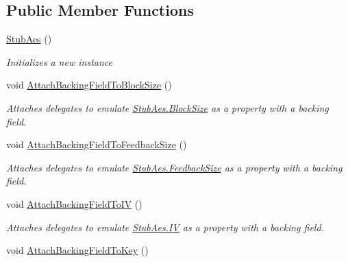 \subsection*{Public Member Functions}
\begin{DoxyCompactItemize}
\item 
\hyperlink{class_system_1_1_security_1_1_cryptography_1_1_fakes_1_1_stub_aes_a09af8007906ba38abb765a8c9af7ebe9}{Stub\-Aes} ()
\begin{DoxyCompactList}\small\item\em Initializes a new instance\end{DoxyCompactList}\item 
void \hyperlink{class_system_1_1_security_1_1_cryptography_1_1_fakes_1_1_stub_aes_aec861ce5444c2709dda3b4ca49999097}{Attach\-Backing\-Field\-To\-Block\-Size} ()
\begin{DoxyCompactList}\small\item\em Attaches delegates to emulate \hyperlink{class_system_1_1_security_1_1_cryptography_1_1_fakes_1_1_stub_aes_a8c105f52d785f5385152d87ad6f73101}{Stub\-Aes.\-Block\-Size} as a property with a backing field.\end{DoxyCompactList}\item 
void \hyperlink{class_system_1_1_security_1_1_cryptography_1_1_fakes_1_1_stub_aes_af8c98a67edc1dab49bda005f94dbe355}{Attach\-Backing\-Field\-To\-Feedback\-Size} ()
\begin{DoxyCompactList}\small\item\em Attaches delegates to emulate \hyperlink{class_system_1_1_security_1_1_cryptography_1_1_fakes_1_1_stub_aes_a2b352de11bd0423d1a4035acb75e5a7a}{Stub\-Aes.\-Feedback\-Size} as a property with a backing field.\end{DoxyCompactList}\item 
void \hyperlink{class_system_1_1_security_1_1_cryptography_1_1_fakes_1_1_stub_aes_a1ee3fd113f81df83006ec13160edaf40}{Attach\-Backing\-Field\-To\-I\-V} ()
\begin{DoxyCompactList}\small\item\em Attaches delegates to emulate \hyperlink{class_system_1_1_security_1_1_cryptography_1_1_fakes_1_1_stub_aes_a7c7de573ea594a263767c18db2fbb90f}{Stub\-Aes.\-I\-V} as a property with a backing field.\end{DoxyCompactList}\item 
void \hyperlink{class_system_1_1_security_1_1_cryptography_1_1_fakes_1_1_stub_aes_ac1b99ac336bef32f059640a7ddc9adef}{Attach\-Backing\-Field\-To\-Key} ()

\end{DoxyCompactItemize}
